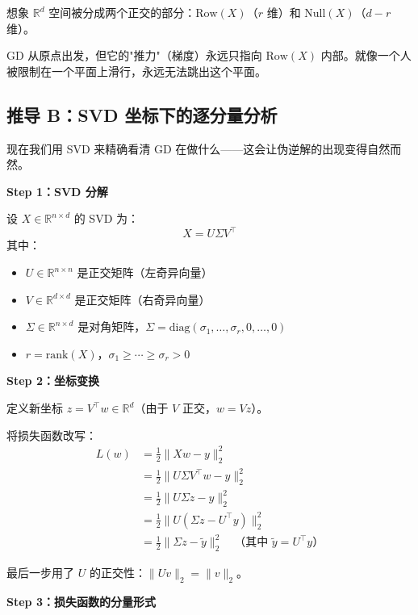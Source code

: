 \documentclass[12pt, a4paper]{ctexart}
\begin{document}
\begin{insight}[几何图像]
想象 $\mathbb{R}^d$ 空间被分成两个正交的部分：$\text{Row}(X)$（$r$ 维）和 $\text{Null}(X)$（$d-r$ 维）。

GD 从原点出发，但它的"推力"（梯度）永远只指向 $\text{Row}(X)$ 内部。就像一个人被限制在一个平面上滑行，永远无法跳出这个平面。
\end{insight}

\subsection{推导 B：SVD 坐标下的逐分量分析}

现在我们用 SVD 来精确看清 GD 在做什么——这会让伪逆解的出现变得自然而然。

\begin{blackboard}

\textbf{Step 1：SVD 分解}

设 $X \in \mathbb{R}^{n \times d}$ 的 SVD 为：
\[
X = U \Sigma V^\top
\]
其中：
\begin{itemize}
    \item $U \in \mathbb{R}^{n \times n}$ 是正交矩阵（左奇异向量）
    \item $V \in \mathbb{R}^{d \times d}$ 是正交矩阵（右奇异向量）
    \item $\Sigma \in \mathbb{R}^{n \times d}$ 是对角矩阵，$\Sigma = \text{diag}(\sigma_1, \ldots, \sigma_r, 0, \ldots, 0)$
    \item $r = \text{rank}(X)$，$\sigma_1 \geq \cdots \geq \sigma_r > 0$
\end{itemize}

\textbf{Step 2：坐标变换}

定义新坐标 $z = V^\top w \in \mathbb{R}^d$（由于 $V$ 正交，$w = Vz$）。

将损失函数改写：
\begin{align*}
L(w) &= \frac{1}{2}\|Xw - y\|_2^2 \\
&= \frac{1}{2}\|U\Sigma V^\top w - y\|_2^2 \\
&= \frac{1}{2}\|U\Sigma z - y\|_2^2 \\
&= \frac{1}{2}\|U(\Sigma z - U^\top y)\|_2^2 \\
&= \frac{1}{2}\|\Sigma z - \tilde{y}\|_2^2 \quad \text{（其中 $\tilde{y} = U^\top y$）}
\end{align*}

最后一步用了 $U$ 的正交性：$\|Uv\|_2 = \|v\|_2$。

\textbf{Step 3：损失函数的分量形式}


\end{blackboard}
\end{document}
